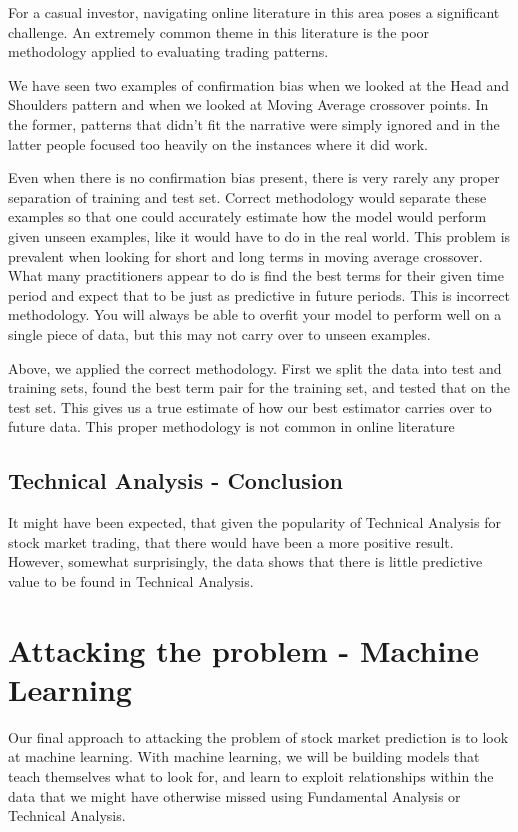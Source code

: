 \documentclass{report}
\begin{document}
For a casual investor, navigating online literature in this area poses a significant challenge. An extremely common theme in this literature is the poor methodology applied to evaluating trading patterns.

We have seen two examples of confirmation bias when we looked at the Head and Shoulders pattern and when we looked at Moving Average crossover points. In the former, patterns that didn't fit the narrative were simply ignored and in the latter people focused too heavily on the instances where it did work.

Even when there is no confirmation bias present, there is very rarely any proper separation of training and test set. Correct methodology would separate these examples so that one could accurately estimate how the model would perform given unseen examples, like it would have to do in the real world. This problem is prevalent when looking for short and long terms in moving average crossover. What many practitioners appear to do is find the best terms for their given time period and expect that to be just as predictive in future periods. This is incorrect methodology. You will always be able to overfit your model to perform well on a single piece of data, but this may not carry over to unseen examples.

Above, we applied the correct methodology. First we split the data into test and training sets, found the best term pair for the training set, and tested that on the test set. This gives us a true estimate of how our best estimator carries over to future data. This proper methodology is not common in online literature


\section{Technical Analysis - Conclusion}

It might have been expected, that given the popularity of Technical Analysis for stock market trading, that there would have been a more positive result. However, somewhat surprisingly, the data shows that there is little predictive value to be found in Technical Analysis. 

\chapter{Attacking the problem - Machine Learning}

Our final approach to attacking the problem of stock market prediction is to look at machine learning. With machine learning, we will be building models that teach themselves what to look for, and learn to exploit relationships within the data that we might have otherwise missed using Fundamental Analysis or Technical Analysis.
\end{document}
